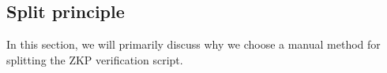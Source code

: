 \subsection{Split principle} \label{sec:split-principle}

In this section, we will primarily discuss why we choose a manual method for splitting the ZKP verification script.



